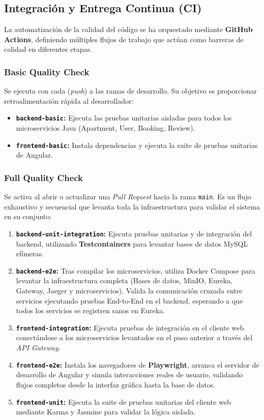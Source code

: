 \subsection{Integración y Entrega Continua (CI)} 
La automatización de la calidad del código se ha orquestado mediante \textbf{GitHub Actions}, definiendo múltiples flujos de trabajo que actúan como barreras de calidad en diferentes etapas.
\subsubsection{Basic Quality Check}
Se ejecuta con cada (\textit{push}) a las ramas de desarrollo. Su objetivo es proporcionar retroalimentación rápida al desarrollador:
\begin{itemize}
    \item \textbf{\texttt{backend-basic}:} Ejecuta las pruebas unitarias aisladas para todos los microservicios Java (Apartment, User, Booking, Review).
    \item \textbf{\texttt{frontend-basic}:} Instala dependencias y ejecuta la suite de pruebas unitarias de Angular.
\end{itemize}

\subsubsection{Full Quality Check}
Se activa al abrir o actualizar una \textit{Pull Request} hacia la rama \texttt{main}. Es un flujo exhaustivo y secuencial que levanta toda la infraestructura para validar el sistema en su conjunto:
\begin{enumerate}
    \item \textbf{\texttt{backend-unit-integration}:} Ejecuta pruebas unitarias y de integración del backend, utilizando \textbf{Testcontainers} para levantar bases de datos MySQL efímeras.
    \item \textbf{\texttt{backend-e2e}:} Tras compilar los microservicios, utiliza Docker Compose para levantar la infraestructura completa (Bases de datos, MinIO, Eureka, Gateway, Jaeger y microservicios). Valida la comunicación cruzada entre servicios ejecutando pruebas End-to-End en el backend, esperando a que todos los servicios se registren sanos en Eureka.
    \item \textbf{\texttt{frontend-integration}:} Ejecuta pruebas de integración en el cliente web conectándose a los microservicios levantados en el paso anterior a través del \textit{API Gateway}.
    \item \textbf{\texttt{frontend-e2e}:} Instala los navegadores de \textbf{Playwright}, arranca el servidor de desarrollo de Angular y simula interacciones reales de usuario, validando flujos completos desde la interfaz gráfica hasta la base de datos.
    \item \textbf{\texttt{frontend-unit}:} Ejecuta la suite de pruebas unitarias del cliente web mediante Karma y Jasmine para validar la lógica aislada.
\end{enumerate}

